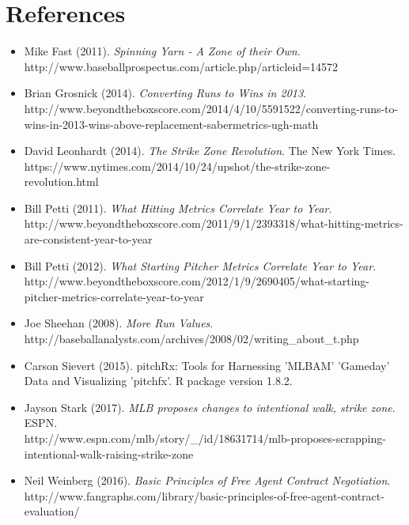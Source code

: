 \documentclass[11pt]{article}
\begin{document}
\section{References}
\begin{itemize}
\item Mike Fast (2011).  \textit{Spinning Yarn - A Zone of their Own}.  \\
http://www.baseballprospectus.com/article.php/articleid=14572  
\item Brian Grosnick (2014). \textit{Converting Runs to Wins in 2013}.\\ http://www.beyondtheboxscore.com/2014/4/10/5591522/converting-runs-to-wins-in-2013-wins-above-replacement-sabermetrics-ugh-math
\item David Leonhardt (2014). \textit{The Strike Zone Revolution}.  The New York Times.\\
https://www.nytimes.com/2014/10/24/upshot/the-strike-zone-revolution.html
\item Bill Petti (2011). \textit{What Hitting Metrics Correlate Year to Year}.\\
http://www.beyondtheboxscore.com/2011/9/1/2393318/what-hitting-metrics-are-consistent-year-to-year
\item Bill Petti (2012). \textit{What Starting Pitcher Metrics Correlate Year to Year}.\\
http://www.beyondtheboxscore.com/2012/1/9/2690405/what-starting-pitcher-metrics-correlate-year-to-year
\item Joe Sheehan (2008).  \textit{More Run Values}.\\
http://baseballanalysts.com/archives/2008/02/writing\_about\_t.php
\item Carson Sievert (2015). pitchRx: Tools for Harnessing 'MLBAM' 'Gameday' Data and Visualizing 'pitchfx'. R package version 1.8.2.
\item Jayson Stark (2017). \textit{MLB proposes changes to intentional walk, strike zone}.  ESPN.\\
http://www.espn.com/mlb/story/\_/id/18631714/mlb-proposes-scrapping-intentional-walk-raising-strike-zone
\item Neil Weinberg (2016). \textit{Basic Principles of Free Agent Contract Negotiation}.\\
http://www.fangraphs.com/library/basic-principles-of-free-agent-contract-evaluation/

\end{itemize}



    
\end{document}
